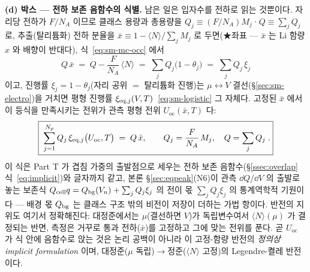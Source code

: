 \textbf{(d) 박스 --- 전하 보존 음함수의 식별.} 남은 일은 입자수를 전하로 읽는 것뿐이다. 자리당 전하가
$F/N_A$ 이므로 클래스 용량과 총용량을 $Q_j\equiv(F/N_A)M_j$·$Q\equiv\sum_jQ_j$ 로, 추출(탈리튬화) 전하
분율을 $\bar x\equiv1-\langle N\rangle/\sum_jM_j$ 로 두면(★좌표 --- $\bar x$ 는 Li 함량 $x$ 와 배향이
반대다), 식~\eqref{eq:sm-mc-occ} 에서
\[
Q\,\bar x
\;=\;Q-\frac{F}{N_A}\,\langle N\rangle
\;=\;\sum_j Q_j\bigl(1-\theta_j\bigr)
\;=\;\sum_j Q_j\,\xi_j
\]
이고, 진행률 $\xi_j=1-\theta_j$(자리 공위 $=$ 탈리튬화 진행)는 $\mu\leftrightarrow V$
결선(\S\ref{sec:sm-electro})을 거치면 평형 진행률 $\xi_{\mathrm{eq},j}(V,T)$~\eqref{eq:sm-logistic} 그 자체다. 고정된
$\bar x$ 에서 이 등식을 만족시키는 전위가 관측 평형 전위 $U_\mathrm{oc}(\bar x,T)$ 다:
\begin{equation}
\boxed{\;\sum_{j=1}^{N_p} Q_j\,\xi_{\mathrm{eq},j}\bigl(U_\mathrm{oc},T\bigr)\;=\;Q\,\bar x,
\qquad Q_j=\frac{F}{N_A}\,M_j,\quad Q=\sum_jQ_j\;.}
\label{eq:sm-mc-balance}
\end{equation}
이 식은 Part T 가 겹침 가중의 출발점으로 세우는 전하 보존 음함수(\S\ref{ssec:overlap} 식~\eqref{eq:implicit})와 글자까지
같고, 본론 \S\ref{sec:eqpeak}(N6)이 관측 $\dd Q/\dd V$ 의 출발로 놓는 보존식
$Q_{\mathrm{cell}} q=Q_{\mathrm{bg}}(V_n)+\sum_jQ_j\xi_j$ 의 전이 몫 $\sum_jQ_j\xi_j$ 의 통계역학적 기원이다 --- 배경 몫
$Q_{\mathrm{bg}}$ 는 클래스 구조 밖의 비전이 저장이 더하는 가법 항이다. 반전의 지위도 여기서 정확해진다: 대정준에서는
$\mu$(결선하면 $V$)가 독립변수여서 $\langle N\rangle(\mu)$ 가 결정되는 반면, 측정은 거꾸로 통과 전하($\bar
x$)를 고정하고 그에 맞는 전위를 푼다. 곧 $U_\mathrm{oc}$ 가 식 안에 음함수로 앉는 것은 논리 공백이 아니라 이
고정-함량 반전의 \emph{정의상 implicit formulation} 이며, 대정준($\mu$ 독립)$\to$정준($\langle N\rangle$
고정)의 Legendre-켤레 반전이다.
